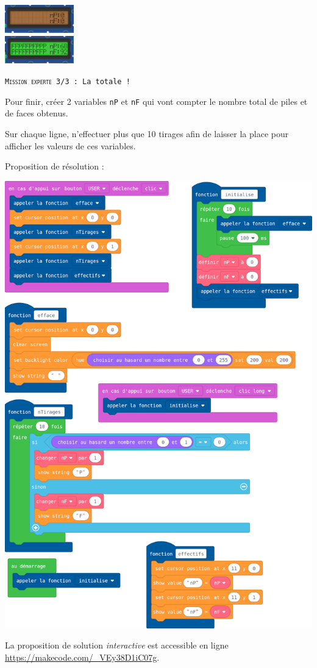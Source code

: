 \begin{eleve}
\begin{minipage}[t]{0.5\linewidth}
    \end{minipage}
    \hfill
    \begin{minipage}[t]{0.4\linewidth}
        \vspace{0cm}
        \hfill\includegraphics[width=3cm]{res/st-pf-05-1.png}\\
        \hfill\includegraphics[width=3cm]{res/st-pf-05-2.png}
    
        \texttt{\textsc{Mission experte 3/3} : La totale !}
        
        Pour finir, créer 2 variables \texttt{nP} et \texttt{nF} qui vont compter le nombre total de piles et de faces obtenus. 
        
        Sur chaque ligne, n'effectuer plus que 10 tirages afin de laisser la place pour afficher les valeurs de ces variables.
    \end{minipage}
\end{eleve}

\newpage
\begin{methode}
Proposition de résolution :

\centerline{\includegraphics[width=0.75\linewidth]{res/st-pf-05-prof.png}}
\end{methode}

\begin{remarque}
    La proposition de solution \emph{interactive} est accessible en ligne \url{https://makecode.com/_VEy38D1iC07g}.
\end{remarque}
